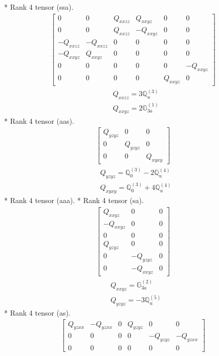 \documentclass[fleqn,8pt,landscape]{jsarticle}
\begin{document}
* Rank 4 tensor (ssa).
\begin{align*}
\begin{bmatrix} 0 & 0 & Q_{xxzz} & Q_{xxyz} & 0 & 0 \\ 0 & 0 & Q_{xxzz} & - Q_{xxyz} & 0 & 0 \\ - Q_{xxzz} & - Q_{xxzz} & 0 & 0 & 0 & 0 \\ - Q_{xxyz} & Q_{xxyz} & 0 & 0 & 0 & 0 \\ 0 & 0 & 0 & 0 & 0 & - Q_{xxyz} \\ 0 & 0 & 0 & 0 & Q_{xxyz} & 0 \end{bmatrix}
\end{align*}
\begin{align*}
& Q_{xxzz} = 3 \mathbb{Q}_{u}^{(3)} \\
& Q_{xxyz} = 2 \mathbb{G}_{3a}^{(1)}
\end{align*}
* Rank 4 tensor (aas).
\begin{align*}
\begin{bmatrix} Q_{yzyz} & 0 & 0 \\ 0 & Q_{yzyz} & 0 \\ 0 & 0 & Q_{xyxy} \end{bmatrix}
\end{align*}
\begin{align*}
& Q_{yzyz} = \mathbb{Q}_{0}^{(3)} - 2 \mathbb{Q}_{u}^{(4)} \\
& Q_{xyxy} = \mathbb{Q}_{0}^{(3)} + 4 \mathbb{Q}_{u}^{(4)}
\end{align*}
* Rank 4 tensor (aaa).
* Rank 4 tensor (sa).
\begin{align*}
\begin{bmatrix} Q_{xxyz} & 0 & 0 \\ - Q_{xxyz} & 0 & 0 \\ 0 & 0 & 0 \\ Q_{yzyz} & 0 & 0 \\ 0 & - Q_{yzyz} & 0 \\ 0 & - Q_{xxyz} & 0 \end{bmatrix}
\end{align*}
\begin{align*}
& Q_{xxyz} = \mathbb{G}_{3a}^{(2)} \\
& Q_{yzyz} = - 3 \mathbb{Q}_{u}^{(5)}
\end{align*}
* Rank 4 tensor (as).
\begin{align*}
\begin{bmatrix} Q_{yzxx} & - Q_{yzxx} & 0 & Q_{yzyz} & 0 & 0 \\ 0 & 0 & 0 & 0 & - Q_{yzyz} & - Q_{yzxx} \\ 0 & 0 & 0 & 0 & 0 & 0 \end{bmatrix}
\end{align*}
\end{document}

